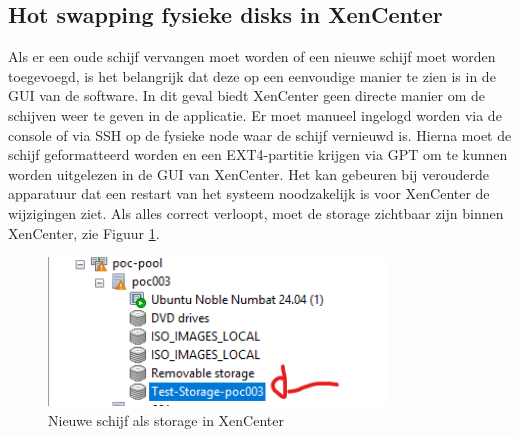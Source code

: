 \subsection{Hot swapping fysieke disks in XenCenter}%
Als er een oude schijf vervangen moet worden of een nieuwe schijf moet worden toegevoegd, is het belangrijk dat deze op een eenvoudige manier te zien is in de GUI van de software.
In dit geval biedt XenCenter geen directe manier om de schijven weer te geven in de applicatie. Er moet manueel ingelogd worden via de console of via SSH op de fysieke node waar de schijf vernieuwd is.
Hierna moet de schijf geformatteerd worden en een EXT4-partitie krijgen via GPT om te kunnen worden uitgelezen in de GUI van XenCenter.
Het kan gebeuren bij verouderde apparatuur dat een restart van het systeem noodzakelijk is voor XenCenter de wijzigingen ziet.
Als alles correct verloopt, moet de storage zichtbaar zijn binnen XenCenter, zie Figuur \ref{fig:swap-storage-xen}.
\begin{figure}[H]
\centering
\includegraphics[width=0.8\textwidth]{../poc/swap-storage-xen.png}
\caption{Nieuwe schijf als storage in XenCenter}
\label{fig:swap-storage-xen}
\end{figure}




